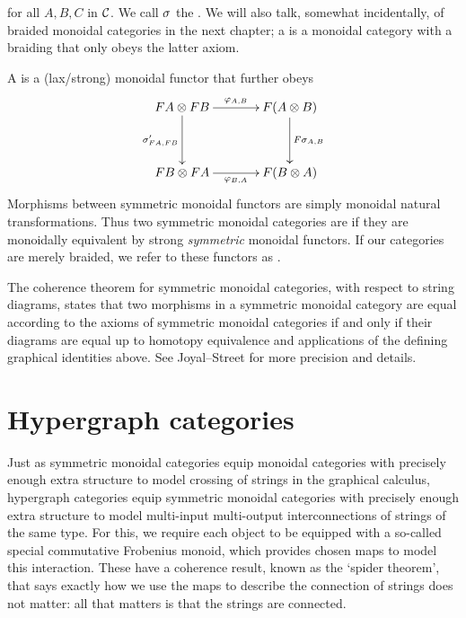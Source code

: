 for all $A,B,C$ in $\mathcal C$.  We call $\sigma$ the . We will also
talk, somewhat incidentally, of braided monoidal categories in the next
chapter; a  is a monoidal category with a
braiding that only obeys the latter axiom.

A  is a (lax/strong) monoidal
functor that further obeys
\[
\xymatrixcolsep{3pc}
\xymatrixrowsep{3pc}
\xymatrix{
FA \ot FB \ar[r]^{\varphi_{A,B}} \ar[d]_{\s'_{FA,FB}} & F(A \ot B)\ar[d]^{F\s_{A,B}}\\
FB \ot FA \ar[r]_{\varphi_{B,A}} & F(B \ot A)
}
\]
Morphisms between symmetric monoidal functors are simply monoidal natural
transformations. Thus two symmetric monoidal categories are  if they are monoidally equivalent by strong
\emph{symmetric} monoidal functors. If our categories are merely braided, we
refer to these functors as .

The coherence theorem for symmetric monoidal categories, with respect to string
diagrams, states that two morphisms in a symmetric monoidal category are equal
according to the axioms of symmetric monoidal categories if and only if their
diagrams are equal up to homotopy equivalence and applications of the defining
graphical identities above. See Joyal--Street \cite[Theorem 2.3]{JoyStr} for
more precision and details.

\section{Hypergraph categories}
Just as symmetric monoidal categories equip monoidal categories with precisely
enough extra structure to model crossing of strings in the graphical calculus,
hypergraph categories equip symmetric monoidal categories with precisely enough
extra structure to model multi-input multi-output interconnections of strings of
the same type. For this, we require each object to be equipped with a so-called
special commutative Frobenius monoid, which provides chosen maps to model this
interaction. These have a coherence result, known as the `spider theorem', that
says exactly how we use the maps to describe the connection of strings does not
matter: all that matters is that the strings are connected. 

